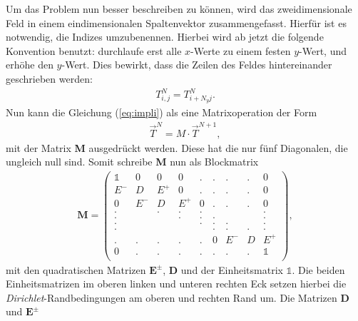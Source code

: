 \documentclass[12pt,a4paper,titlepage,headinclude,bibtotoc]{scrartcl}
\begin{document}
Um das Problem nun besser beschreiben zu können, wird das zweidimensionale Feld in einem eindimensionalen Spaltenvektor zusammengefasst. Hierfür ist es notwendig, die Indizes umzubenennen. Hierbei wird ab jetzt die folgende Konvention benutzt: durchlaufe erst alle $x$-Werte zu einem festen $y$-Wert, und erhöhe den $y$-Wert. Dies bewirkt, dass die Zeilen des Feldes hintereinander geschrieben werden:
\begin{align*}
T_{i,j}^{N} = T_{i+N_y j}^{N}.
\end{align*}
Nun kann die Gleichung (\ref{eq:impli}) als eine Matrixoperation der Form
\begin{align*}
\vec{T}^N = M \cdot \vec{T}^{N+1},
\end{align*} 
mit der Matrix \textbf{M} ausgedrückt werden.
Diese hat die nur fünf Diagonalen, die ungleich null sind.
Somit schreibe \textbf{M} nun als Blockmatrix
\begin{align*}
\boldsymbol{M} = \begin{pmatrix}
  \mathds{1}  & 0 & 0 &  0 & . & . & . & . & 0 \\
  E^-  & D & E^+ &  0 & . & . & . & . & 0 \\
  0  & E^- & D & E^+ & 0 &  . & . & . & 0\\
  . & & . & . & . & & & &  . \\
  . & & & . & . & . & & &  . \\
  . & & & &  . & . & . & &  . \\
  . & &  & & &  . & . & . &  . \\
  .  & . & . & . & . & 0 & E^- & D & E^+ \\
  0  & . & . & . & . & . & . & . & \mathds{1} \\
 \end{pmatrix}
,
\end{align*}
mit den quadratischen Matrizen $\textbf{E}^\pm$, \textbf{D} und der Einheitsmatrix $\mathds{1}$. Die beiden Einheitsmatrizen im oberen linken und unteren rechten Eck setzen hierbei die \textit{Dirichlet}-Randbedingungen am oberen und rechten Rand um.
Die Matrizen \textbf{D} und $\textbf{E}^\pm$ 
\end{document}

